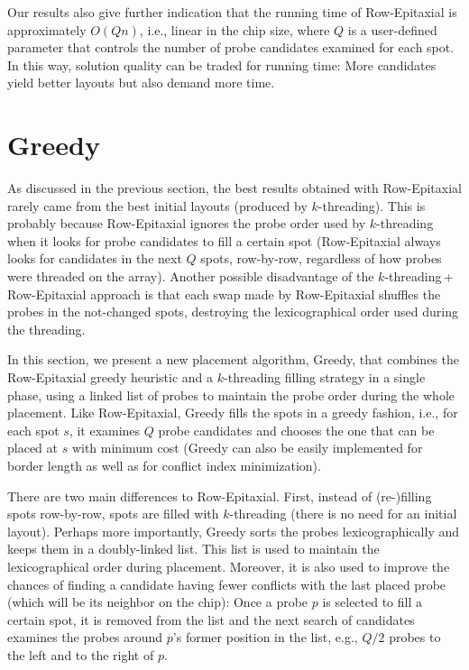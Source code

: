 Our results also give further indication that the running time of Row-Epitaxial
is approximately $O(Qn)$, i.e., linear in the chip size, where $Q$ is a
user-defined parameter that controls the number of probe candidates examined for
each spot. In this way, solution quality can be traded for running time: More
candidates yield better layouts but also demand more time.

\section{Greedy}
\label{sec:placement_greedy}

As discussed in the previous section, the best results obtained with
Row-Epitaxial rarely came from the best initial layouts (produced by
$k$-threading). This is probably because Row-Epitaxial ignores the probe order
used by $k$-threading when it looks for probe candidates to fill a certain spot
(Row-Epitaxial always looks for candidates in the next $Q$ spots, row-by-row,
regardless of how probes were threaded on the array). Another possible
disadvantage of the $k$-threading\,+\,Row-Epitaxial approach is that each swap
made by Row-Epitaxial shuffles the probes in the not-changed spots, destroying
the lexicographical order used during the threading.

In this section, we present a new placement algorithm, Greedy, that combines the
Row-Epitaxial greedy heuristic and a $k$-threading filling strategy in a single
phase, using a linked list of probes to maintain the probe order during the
whole placement. Like Row-Epitaxial, Greedy fills the spots in a greedy fashion,
i.e., for each spot $s$, it examines $Q$ probe candidates and chooses the one
that can be placed at $s$ with minimum cost (Greedy can also be easily
implemented for border length as well as for conflict index minimization).

There are two main differences to Row-Epitaxial. First, instead of (re-)filling
spots row-by-row, spots are filled with $k$-threading (there is no need for an
initial layout). Perhaps more importantly, Greedy sorts the probes
lexicographically and keeps them in a doubly-linked list. This list is used to
maintain the lexicographical order during placement. Moreover, it is also used
to improve the chances of finding a candidate having fewer conflicts with the
last placed probe (which will be its neighbor on the chip): Once a probe $p$ is
selected to fill a certain spot, it is removed from the list and the next search
of candidates examines the probes around $p$'s former position in the list,
e.g., $Q/2$ probes to the left and to the right of $p$.


